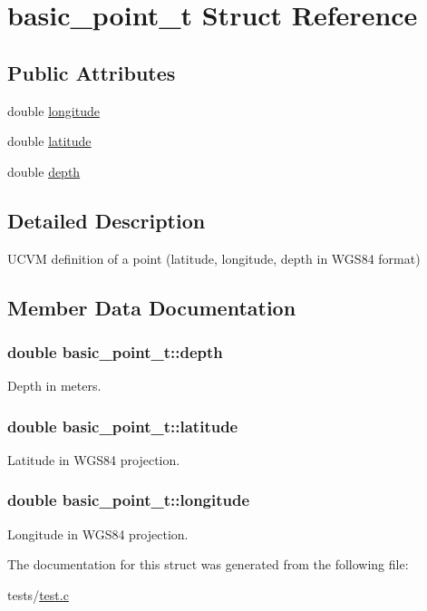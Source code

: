 \hypertarget{structbasic__point__t}{\section{basic\+\_\+point\+\_\+t Struct Reference}
\label{structbasic__point__t}
}
\subsection*{Public Attributes}
\begin{DoxyCompactItemize}
\item 
double \hyperlink{structbasic__point__t_aa134515abe863d6890ec63cd4238578f}{longitude}
\item 
double \hyperlink{structbasic__point__t_a35ee8ad8942997a5d32e155835249e77}{latitude}
\item 
double \hyperlink{structbasic__point__t_ab23e89c49a4e558eb8dc6cc62cb55cff}{depth}
\end{DoxyCompactItemize}


\subsection{Detailed Description}
U\+C\+V\+M definition of a point (latitude, longitude, depth in W\+G\+S84 format) 

\subsection{Member Data Documentation}
\hypertarget{structbasic__point__t_ab23e89c49a4e558eb8dc6cc62cb55cff}{
\subsubsection[{depth}]{\setlength{\rightskip}{0pt plus 5cm}double basic\+\_\+point\+\_\+t\+::depth}}\label{structbasic__point__t_ab23e89c49a4e558eb8dc6cc62cb55cff}
Depth in meters. \hypertarget{structbasic__point__t_a35ee8ad8942997a5d32e155835249e77}{
\subsubsection[{latitude}]{\setlength{\rightskip}{0pt plus 5cm}double basic\+\_\+point\+\_\+t\+::latitude}}\label{structbasic__point__t_a35ee8ad8942997a5d32e155835249e77}
Latitude in W\+G\+S84 projection. \hypertarget{structbasic__point__t_aa134515abe863d6890ec63cd4238578f}{
\subsubsection[{longitude}]{\setlength{\rightskip}{0pt plus 5cm}double basic\+\_\+point\+\_\+t\+::longitude}}\label{structbasic__point__t_aa134515abe863d6890ec63cd4238578f}
Longitude in W\+G\+S84 projection. 

The documentation for this struct was generated from the following file\+:\begin{DoxyCompactItemize}
\item 
tests/\hyperlink{test_8c}{test.\+c}\end{DoxyCompactItemize}
